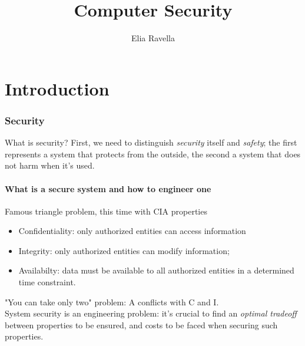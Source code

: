 \documentclass{article}
\title{Computer Security}
\author{Elia Ravella}
\begin{document}
	\begin{titlepage}
		\maketitle
	\end{titlepage}
	
	\tableofcontents
	\clearpage
	
	\clearpage \part{Introduction} 
		\section{Security}
			What is security? First, we need to distinguish \emph{security} itself and \emph{safety}; the first represents a system that protects from the outside, the second a system that does not harm when it's used.
			
			\subsection{What is a secure system and how to engineer one}
				Famous triangle problem, this time with CIA properties
				\begin{itemize}
					\item Confidentiality: only authorized entities can access information
					\item Integrity: only authorized entities can modify information;
					\item Availabilty: data must be available to all authorized entities in a determined time constraint.
				\end{itemize}
				"You can take only two" problem: A conflicts with C and I.\\
				System security is an engineering problem: it's crucial to find an \emph{optimal tradeoff} between properties to be ensured, and costs to be faced when securing such properties.
			
\end{document}
